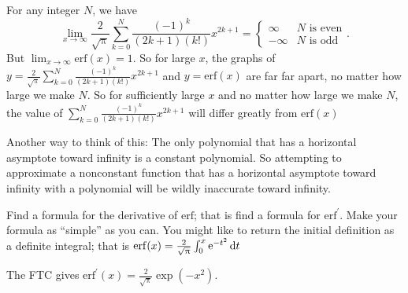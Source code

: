 \documentclass[12pt,fleqn]{exam}
\newcommand{\erf}{\mathrm{erf}}
\begin{document}
\begin{questions}
\begin{solution}[3.5in]
For any integer $N$, we have $$\lim_{x \to \infty} \frac{2}{\sqrt{\uppi}}  \sum_{k=0}^{N} \frac{(-1)^k}{ (2 k + 1) (k !)}   x^{2 k +1} = \begin{cases} \infty & N \text{ is even} \\ -\infty & N \text{ is odd} \end{cases}. $$ But $\displaystyle \lim_{x \to \infty} \erf(x) = 1$. 
So for large $x$,  the graphs of $y = \frac{2}{\sqrt{\uppi}}  \sum_{k=0}^{N} \frac{(-1)^k}{ (2 k + 1) (k !)}   x^{2 k +1}$
and $y  = \erf(x) $ are far far apart, no matter how large we make $N$.  So for sufficiently large $x$ and no matter how 
large we make $N$, the value of $\sum_{k=0}^{N} \frac{(-1)^k}{ (2 k + 1) (k !)}   x^{2 k +1}$ will differ greatly
from $\erf(x)$

\quad Another way to think of this: The only polynomial that has a horizontal asymptote toward infinity is a constant polynomial. So attempting
to approximate a nonconstant function that has a horizontal asymptote toward infinity with a polynomial 
will be wildly inaccurate toward infinity.

\end{solution}

\question  [1] Find a formula for the derivative of $\erf$; that is find a formula for $\erf^\prime$.  Make your formula as ``simple'' as you can.  You might like to return the initial definition as a definite integral; that is $\erf(x) = \frac{2}{\sqrt{\uppi}} \large \int_0^x \mathrm{e}^{-t^2} \, \mathrm{d} t$

\begin{solution} The FTC gives $\erf^\prime(x)  = \frac{2}{\sqrt{\uppi}} \exp(-x^2).$

\end{solution}

\end{questions}
\end{document}
